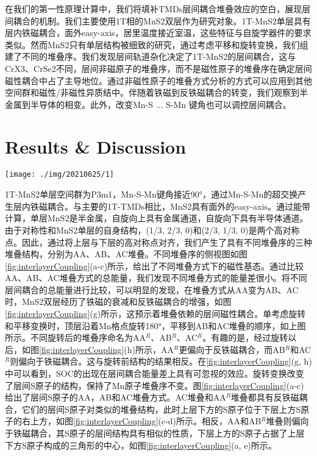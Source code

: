 \documentclass[reprint, aps, prb, showkeys]{revtex4-2}
\begin{document}
在我们的第一性原理计算中，我们将填补TMDs层间耦合堆叠效应的空白，展现层间耦合的机制。我们主要使用1T相的MnS2双层作为研究对象。1T-MnS2单层具有层内铁磁耦合，面外easy-axis，居里温度接近室温，这些特征与自旋学器件的要求类似。然而MnS2只有单层结构被细致的研究，通过考虑平移和旋转变换，我们组建了不同的堆叠序。我们发现层间轨道杂化决定了1T-MnS2的层间耦合，这与CrX3、CrSe2不同，层间非磁原子的堆叠序，而不是磁性原子的堆叠序在确定层间磁性耦合中占了主导地位。通过非磁性原子的堆叠方式分析的方式可以应用到其他空间群和磁性/非磁性异质结中。伴随着铁磁到反铁磁耦合的转变，我们观察到半金属到半导体的相变。此外，改变Mn-S ... S-Mn 键角也可以调控层间耦合。

\section{Results \& Discussion}
\begin{figure*}[t]
    \texttt{[image: ./img/20210625/1]}
    \caption{\label{fig:interlayerCoupling} 
    Stacking-dependent interlayer coupling in MnS2
    }
\end{figure*}
1T-MnS2单层空间群为P3m1，Mn-S-Mn键角接近90°，通过Mn-S-Mn的超交换产生层内铁磁耦合。与主要的1T-TMDs相比，MnS2具有面外的easy-axis。通过能带计算，单层MnS2是半金属，自旋向上具有金属通道，自旋向下具有半导体通道。由于对称性和MnS2单层的自身结构，(1/3, 2/3, 0)和(2/3, 1/3, 0)是两个高对称点。因此，通过将上层与下层的高对称点对齐，我们产生了具有不同堆叠序的三种堆叠结构，分别为AA、AB、AC堆叠。不同堆叠序的侧视图如图\ref{fig:interlayerCoupling}(a-c)所示，给出了不同堆叠方式下的磁性基态。通过比较AA、AB、AC堆叠方式的总能量，我们发现不同堆叠方式的能量差很小。将不同层间耦合的总能量进行比较，可以明显的发现，在堆叠方式从AA变为AB、AC时，MnS2双层经历了铁磁的衰减和反铁磁耦合的增强，如图\ref{fig:interlayerCoupling}(g)所示，这预示着堆叠依赖的层间磁性耦合。单考虑旋转和平移变换时，顶层沿着Mn格点旋转180°，平移到AB和AC堆叠的顺序，如上图所示。不同旋转后的堆叠序命名为AA$^R$、AB$^R$、AC$^R$。有趣的是，经过旋转以后，如图\ref{fig:interlayerCoupling}(h)所示，AA$^R$更偏向于反铁磁耦合，而AB$^R$和AC$^R$则偏向于铁磁耦合。这与旋转前结构的结果相反。在\ref{fig:interlayerCoupling}(g, h)中可以看到，SOC的出现在层间耦合能量差上具有可忽视的效应。旋转变换改变了层间S原子的结构，保持了Mn原子堆叠序不变。图\ref{fig:interlayerCoupling}(a-c)给出了层间S原子的AA，AB和AC堆叠方式。AC堆叠和AA$^R$堆叠都具有反铁磁耦合，它们的层间S原子对类似的堆叠结构，此时上层下方的S原子位于下层上方S原子的右上方，如图\ref{fig:interlayerCoupling}(c-d)所示。相反，AA和AB$^R$堆叠则偏向于铁磁耦合，其S原子的层间结构具有相似的性质，下层上方的S原子占据了上层下方S原子构成的三角形的中心，如图\ref{fig:interlayerCoupling}(a, e)所示。
\end{document}
